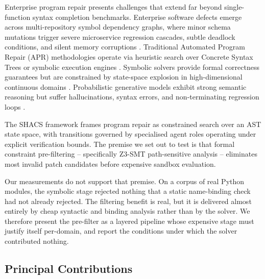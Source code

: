 \documentclass{article}
\begin{document}
Enterprise program repair presents challenges that extend far beyond single-function syntax completion benchmarks. Enterprise software defects emerge across multi-repository symbol dependency graphs, where minor schema mutations trigger severe microservice regression cascades, subtle deadlock conditions, and silent memory corruptions \cite{arxiv_2405_01543,arxiv_2203_02155}. Traditional Automated Program Repair (APR) methodologies operate via heuristic search over Concrete Syntax Trees or symbolic execution engines \cite{arxiv_2010_11146}. Symbolic solvers provide formal correctness guarantees but are constrained by state-space explosion in high-dimensional continuous domains \cite{arxiv_2404_01131}. Probabilistic generative models exhibit strong semantic reasoning but suffer hallucinations, syntax errors, and non-terminating regression loops \cite{arxiv_2005_14165}.

The SHACS framework frames program repair as constrained search over an AST state space, with transitions governed by specialised agent roles operating under explicit verification bounds. The premise we set out to test is that formal constraint pre-filtering -- specifically Z3-SMT path-sensitive analysis -- eliminates most invalid patch candidates before expensive sandbox evaluation.

Our measurements do not support that premise. On a corpus of real Python modules, the symbolic stage rejected nothing that a static name-binding check had not already rejected. The filtering benefit is real, but it is delivered almost entirely by cheap syntactic and binding analysis rather than by the solver. We therefore present the pre-filter as a layered pipeline whose expensive stage must justify itself per-domain, and report the conditions under which the solver contributed nothing.


\subsection{Principal Contributions}
\end{document}
